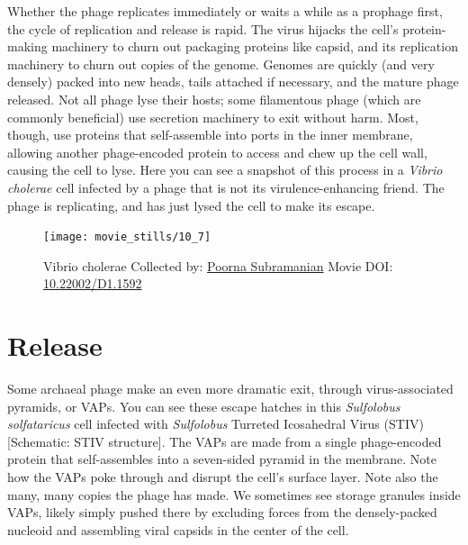 \documentclass[]{tufte-book}
\begin{document}
Whether the phage replicates immediately or waits a while as a prophage
first, the cycle of replication and release is rapid. The virus hijacks
the cell's protein-making machinery to churn out packaging proteins like
capsid, and its replication machinery to churn out copies of the genome.
Genomes are quickly (and very densely) packed into new heads, tails
attached if necessary, and the mature phage released. Not all phage lyse
their hosts; some filamentous phage (which are commonly beneficial) use
secretion machinery to exit without harm. Most, though, use proteins
that self-assemble into ports in the inner membrane, allowing another
phage-encoded protein to access and chew up the cell wall, causing the
cell to lyse. Here you can see a snapshot of this process in a
\emph{Vibrio cholerae} cell infected by a phage that is not its
virulence-enhancing friend. The phage is replicating, and has just lysed
the cell to make its escape.





\begin{figure}
\texttt{[image: movie\_stills/10\_7]} \caption[Vibrio cholerae Collected by:
\protect\hyperlink{poorna_subramanian}{Poorna Subramanian} Movie DOI:
\href{https://doi.org/10.22002/D1.1592}{10.22002/D1.1592}]{Vibrio cholerae Collected by:
\protect\hyperlink{poorna_subramanian}{Poorna Subramanian} Movie DOI:
\href{https://doi.org/10.22002/D1.1592}{10.22002/D1.1592}}\label{fig:10-7}
\end{figure}

\section{Release}\label{release}

Some archaeal phage make an even more dramatic exit, through
virus-associated pyramids, or VAPs. You can see these escape hatches in
this \emph{Sulfolobus solfataricus} cell infected with \emph{Sulfolobus}
Turreted Icosahedral Virus (STIV) {[}Schematic: STIV structure{]}. The
VAPs are made from a single phage-encoded protein that self-assembles
into a seven-sided pyramid in the membrane. Note how the VAPs poke
through and disrupt the cell's surface layer. Note also the many, many
copies the phage has made. We sometimes see storage granules inside
VAPs, likely simply pushed there by excluding forces from the
densely-packed nucleoid and assembling viral capsids in the center of
the cell.
\end{document}
